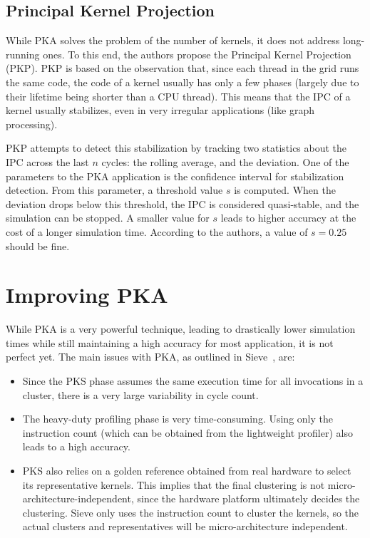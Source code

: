 \subsection{Principal Kernel Projection}\label{subsec:pkp}
While PKA solves the problem of the number of kernels, it does not address long-running ones.
To this end, the authors propose the Principal Kernel Projection (PKP).
PKP is based on the observation that, since each thread in the grid runs the same code, the code of a kernel usually has only a few phases (largely due to their lifetime being shorter than a CPU thread).
This means that the IPC of a kernel usually stabilizes, even in very irregular applications (like graph processing).

PKP attempts to detect this stabilization by tracking two statistics about the IPC across the last $n$ cycles: the rolling average, and the deviation.
One of the parameters to the PKA application is the confidence interval for stabilization detection.
From this parameter, a threshold value $s$ is computed.
When the deviation drops below this threshold, the IPC is considered quasi-stable, and the simulation can be stopped.
A smaller value for $s$ leads to higher accuracy at the cost of a longer simulation time.
According to the authors, a value of $s = 0.25$ should be fine.

\section{Improving PKA}\label{sec:improving-pka-sieve}
While PKA is a very powerful technique, leading to drastically lower simulation times while still maintaining a high accuracy for most application, it is not perfect yet.
The main issues with PKA, as outlined in Sieve~\cite{sieve}, are:
\begin{itemize}
    \item Since the PKS phase assumes the same execution time for all invocations in a cluster, there is a very large variability in cycle count.
    \item The heavy-duty profiling phase is very time-consuming.
    Using only the instruction count (which can be obtained from the lightweight profiler) also leads to a high accuracy.
    \item PKS also relies on a golden reference obtained from real hardware to select its representative kernels.
    This implies that the final clustering is not micro-architecture-independent, since the hardware platform ultimately decides the clustering.
    Sieve only uses the instruction count to cluster the kernels, so the actual clusters and representatives will be micro-architecture independent.
\end{itemize}

